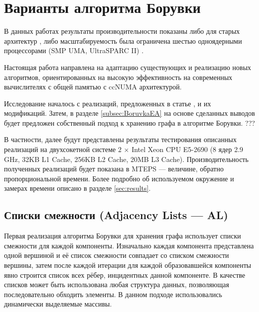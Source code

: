 \documentclass[a4paper,10pt]{extarticle}
\begin{document}
\section{Варианты алгоритма Борувки}
В данных работах \cite{dense-mst,boruvka-prima,boruvka-cm5} результаты производительности показаны либо для старых архитектур \cite{dense-mst,boruvka-cm5}, либо масштабируемость была ограничена шестью одноядерными процессорами (SMP  UMA, UltraSPARC II) \cite{boruvka-prima}.

Настоящая работа направлена на адаптацию существующих и реализацию новых алгоритмов, ориентированных на высокую эффективность на современных вычислителях с общей памятью с ccNUMA архитектурой.

Исследование началось с реализаций, предложенных в статье \cite{boruvka-prima}, и их модификаций. Затем, в разделе \ref{subsec:BoruvkaEA} на основе сделанных выводов будет предложен собственный подход к хранению графа в алгоритме Борувки. ???

В частности, далее будут представлены результаты тестирования описанных реализаций на двухсокетной системе $2$ $\times$ Intel Xeon CPU E5-2690 (8 ядер 2.9 GHz, 32KB L1 Cache, 256KB L2 Cache, 20MB L3 Cache). Производительность полученных реализаций будет показана в MTEPS --- величине, обратно пропорциональной времени. Более подробно об используемом окружение и замерах времени описано в разделе \ref{sec:results}.

\subsection{Списки смежности (Adjacency Lists --- AL)}

Первая реализация алгоритма Борувки для хранения графа использует списки смежности для каждой компоненты. Изначально каждая компонента представлена одной вершиной и её список смежности совпадает со списком смежности вершины, затем после каждой итерации для каждой образовавшейся компоненты явно строится список всех рёбер, инцидентных данной компоненте.
В качестве списков может быть использована любая структура данных, позволяющая последовательно обходить элементы. В данном подходе использовались динамически выделяемые массивы.
\end{document}

